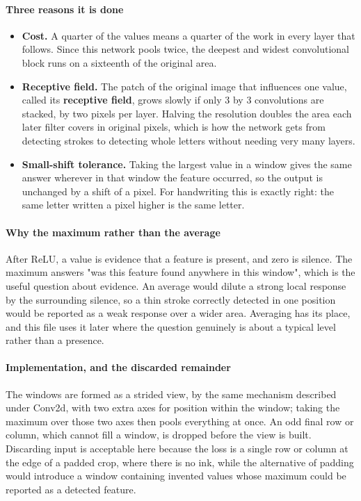 \paragraph{Three reasons it is done}

\begin{itemize}\setlength\itemsep{0pt}
  \item \textbf{Cost.} A quarter of the values means a quarter of the work in every layer that follows. Since this network pools twice, the deepest and widest convolutional block runs on a sixteenth of the original area.
  \item \textbf{Receptive field.} The patch of the original image that influences one value, called its \textbf{receptive field}, grows slowly if only 3 by 3 convolutions are stacked, by two pixels per layer. Halving the resolution doubles the area each later filter covers in original pixels, which is how the network gets from detecting strokes to detecting whole letters without needing very many layers.
  \item \textbf{Small-shift tolerance.} Taking the largest value in a window gives the same answer wherever in that window the feature occurred, so the output is unchanged by a shift of a pixel. For handwriting this is exactly right: the same letter written a pixel higher is the same letter.
\end{itemize}

\paragraph{Why the maximum rather than the average}
After ReLU, a value is evidence that a feature is present, and zero is silence. The maximum answers "was this feature found anywhere in this window", which is the useful question about evidence. An average would dilute a strong local response by the surrounding silence, so a thin stroke correctly detected in one position would be reported as a weak response over a wider area. Averaging has its place, and this file uses it later where the question genuinely is about a typical level rather than a presence.


\paragraph{Implementation, and the discarded remainder}
The windows are formed as a strided view, by the same mechanism described under Conv2d, with two extra axes for position within the window; taking the maximum over those two axes then pools everything at once. An odd final row or column, which cannot fill a window, is dropped before the view is built. Discarding input is acceptable here because the loss is a single row or column at the edge of a padded crop, where there is no ink, while the alternative of padding would introduce a window containing invented values whose maximum could be reported as a detected feature.


